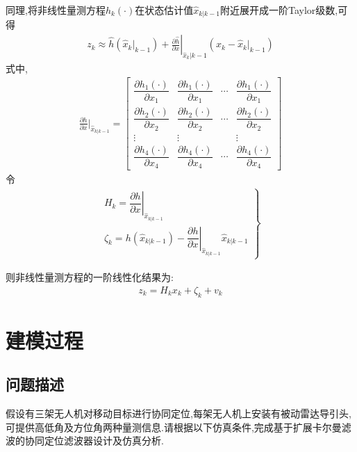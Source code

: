 \documentclass[12pt]{article}
\numberwithin{equation}{section} %
\begin{document}
同理,将非线性量测方程$h_k(\cdot)$在状态估计值$\hat{x}_{k|k-1}$附近展开成一阶Taylor级数,可得
\begin{align}
    z_k \approx \left.\hat{h}(\hat{x}_{k}|_{k-1})+\frac{\partial\hat{h}}{\partial x}\right|_{\hat{x}_{k}|k-1} (x_{k}-\hat{x}_{k}|_{k-1})
\end{align}
式中,
\begin{align}
    \frac{\partial h}{\partial x}\bigg \vert_{\hat{x}_{k|k-1}} = 
    \begin{bmatrix}
     \dfrac{\partial h_1(\cdot)}{\partial x_1} & \dfrac{\partial h_1(\cdot)}{\partial x_1} & \cdots & \dfrac{\partial h_1(\cdot)}{\partial x_1}\\
     \dfrac{\partial h_2(\cdot)}{\partial x_2} & \dfrac{\partial h_2(\cdot)}{\partial x_2} & \cdots & \dfrac{\partial h_2(\cdot)}{\partial x_2}\\
     \vdots & \vdots &  & \vdots\\
     \dfrac{\partial h_4(\cdot)}{\partial x_4} & \dfrac{\partial h_4(\cdot)}{\partial x_4} & \cdots & \dfrac{\partial h_4(\cdot)}{\partial x_4}
    \end{bmatrix}
\end{align}
令
\begin{align}
    \left.\begin{array}{l}{{H_{k}=\left.\dfrac{\partial h}{\partial x}\right|_{\hat{x}_{k|k-1}}}}\\ {{\left.\zeta_{k}= h(\hat{x}_{k|k-1})-\dfrac{\partial h}{\partial x}\right|_{\hat{x}_{k|k-1}}\hat{x}_{k|k-1}}}\end{array} \right\}
\end{align}

则非线性量测方程的一阶线性化结果为:
\begin{align}
    z_k = H_k x_k + \zeta_k +v_k
\end{align}

\section{建模过程}
\subsection{问题描述}
假设有三架无人机对移动目标进行协同定位,每架无人机上安装有被动雷达导引头,可提供高低角及方位角两种量测信息.请根据以下仿真条件,完成基于扩展卡尔曼滤波的协同定位滤波器设计及仿真分析.
\end{document}
